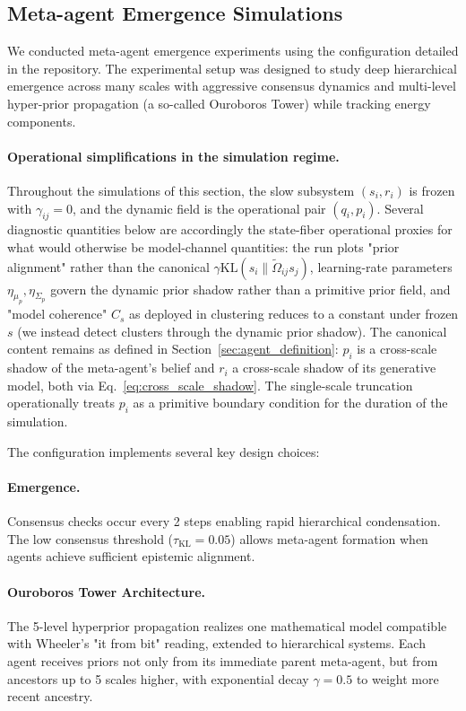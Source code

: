 \documentclass[11pt]{article}
\begin{document}
\subsection{Meta-agent Emergence Simulations}
\label{sec:meta_agent_emergence}

We conducted meta-agent emergence experiments using the configuration detailed in the repository. The experimental setup was designed to study deep hierarchical emergence across many scales with aggressive consensus dynamics and multi-level hyper-prior propagation (a so-called Ouroboros Tower) while tracking energy components.

\paragraph{Operational simplifications in the simulation regime.}
Throughout the simulations of this section, the slow subsystem $(s_i, r_i)$ is frozen with $\gamma_{ij} = 0$, and the dynamic field is the operational pair $(q_i, p_i)$. Several diagnostic quantities below are accordingly the state-fiber operational proxies for what would otherwise be model-channel quantities: the run plots "prior alignment" rather than the canonical $\gamma\mathrm{KL}(s_i\|\tilde\Omega_{ij}s_j)$, learning-rate parameters $\eta_{\mu_p}, \eta_{\Sigma_p}$ govern the dynamic prior shadow rather than a primitive prior field, and "model coherence" $C_s$ as deployed in clustering reduces to a constant under frozen $s$ (we instead detect clusters through the dynamic prior shadow). The canonical content remains as defined in Section~\ref{sec:agent_definition}: $p_i$ is a cross-scale shadow of the meta-agent's belief and $r_i$ a cross-scale shadow of its generative model, both via Eq.~\eqref{eq:cross_scale_shadow}. The single-scale truncation operationally treats $p_i$ as a primitive boundary condition for the duration of the simulation.

The configuration implements several key design choices:

\paragraph{Emergence.}
Consensus checks occur every 2 steps enabling rapid hierarchical condensation. The low consensus threshold ($\tau_{\mathrm{KL}} = 0.05$) allows meta-agent formation when agents achieve sufficient epistemic alignment.

\paragraph{Ouroboros Tower Architecture.}
The 5-level hyperprior propagation realizes one mathematical model compatible with Wheeler's "it from bit" reading, extended to hierarchical systems. Each agent receives priors not only from its immediate parent meta-agent, but from ancestors up to 5 scales higher, with exponential decay $\gamma = 0.5$ to weight more recent ancestry.
\end{document}
